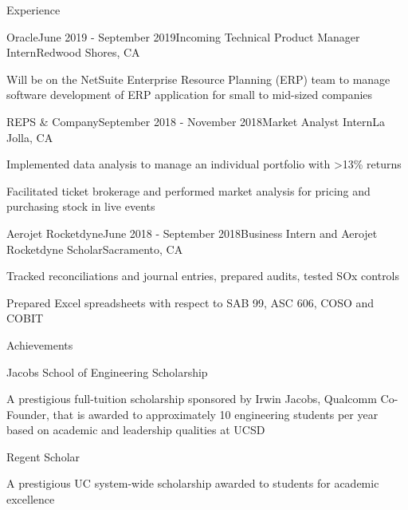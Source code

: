 \documentclass{resume} %
\begin{document}
\begin{rSection}{\color{NavyBlue}\faCode{ }}{Experience}

\begin{rSubsection}{}{Oracle}{June 2019 - September 2019}{Incoming Technical Product Manager Intern}{Redwood Shores, CA}
\item Will be on the NetSuite Enterprise Resource Planning (ERP) team to manage software development of ERP application for small to mid-sized companies

\end{rSubsection}

\begin{rSubsection}{}{REPS \& Company}{September 2018 - November 2018}{Market Analyst Intern}{La Jolla, CA}
\item Implemented data analysis to manage an individual portfolio with >13\% returns
\item Facilitated ticket brokerage and performed market analysis for pricing and purchasing stock in live events
\end{rSubsection}



\begin{rSubsection}{}{Aerojet Rocketdyne}{June 2018 - September 2018}{Business Intern and Aerojet Rocketdyne Scholar}{Sacramento, CA}
\item Tracked reconciliations and journal entries, prepared audits, tested SOx controls
\item Prepared Excel spreadsheets with respect to SAB 99, ASC 606, COSO and COBIT
\end{rSubsection}

\end{rSection}



\begin{rSection}{\color{NavyBlue}\faTrophy{ }}{Achievements} \begin{rSubsection}{}{Jacobs School of Engineering Scholarship}{}{}{}
\item A prestigious full-tuition scholarship sponsored by Irwin Jacobs, Qualcomm Co-Founder, that is awarded to approximately 10 engineering students per year based on academic and leadership qualities at UCSD 

\begin{rSubsection}{}{Regent Scholar}{}{}{}
\item A prestigious UC system-wide scholarship awarded to students for academic excellence
\end{rSubsection}

\end{rSubsection}


\end{rSection}
\end{document}
